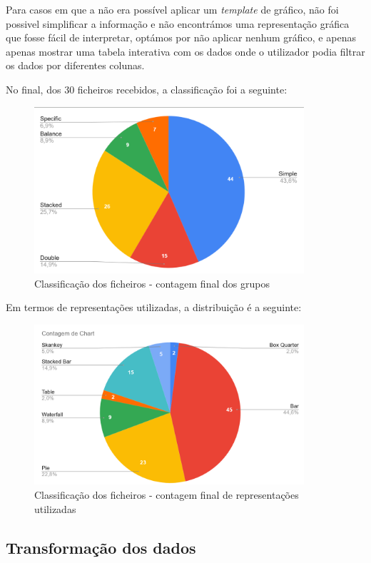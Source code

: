 Para casos em que a não era possível aplicar um \textit{template} de gráfico, não foi possivel simplificar a informação e não encontrámos uma representação gráfica que fosse fácil de interpretar, optámos por não aplicar nenhum gráfico, e apenas apenas mostrar uma tabela interativa com os dados onde o utilizador podia filtrar os dados por diferentes colunas.

No final, dos 30 ficheiros recebidos, a classificação foi a seguinte:

\begin{figure}[h]
    \centering
    \includegraphics[max width=10cm]{./img/stats1}
 \caption{Classificação dos ficheiros - contagem final dos grupos}
 \end{figure}

Em termos de representações utilizadas, a distribuição é a seguinte:
\begin{figure}[h]
    \centering
    \includegraphics[max width=10cm]{./img/stats2}
 \caption{Classificação dos ficheiros - contagem final de representações utilizadas}
 \end{figure}

\subsection{Transformação dos dados}

